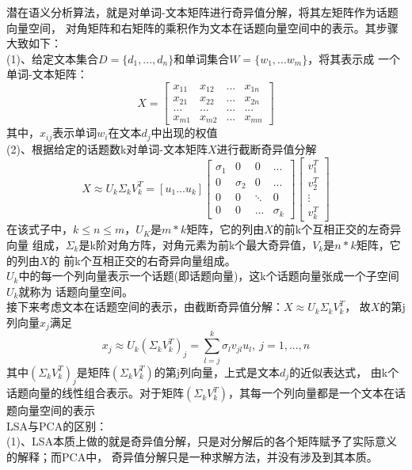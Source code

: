 \documentclass[answers]{exam}  %
\begin{document}
\begin{questions}
\begin{solution}
\begin{parts}
		潜在语义分析算法，就是对单词-文本矩阵进行奇异值分解，将其左矩阵作为话题向量空间，
		对角矩阵和右矩阵的乘积作为文本在话题向量空间中的表示。其步骤大致如下：\\
		(1)、给定文本集合$D=\{d_1,...,d_n\}$和单词集合$W=\{w_1,...w_m\}$，将其表示成
		一个单词-文本矩阵：$$X=
\left[
\begin{matrix}
	x_{11} & x_{12} & ... & x_{1n}\\
	x_{21} & x_{22} & ... & x_{2n}\\
	...    & ...    & ... & ...\\
	x_{m1} & x_{m2} & ... & x_{mn}
\end{matrix}
\right]
		$$
		其中，$x_{ij}$表示单词$w_i$在文本$d_j$中出现的权值\\
		(2)、根据给定的话题数k对单词-文本矩阵$X$进行截断奇异值分解$$
		X\approx U_k\Sigma_kV_k^T=[u_1 ... u_k ]
\left[
	\begin{matrix}
		\sigma_1 & 0 & 0 & ... \\
		0 & \sigma_2 & 0 & ... \\
		0 & 0 & \ddots & 0\\
		0 & 0 & ... & \sigma_k
	\end{matrix}		
\right]
\left[
	\begin{matrix}
		v_1^T\\
		v_2^T\\
		\vdots\\
		v_k^T
	\end{matrix}		
\right]
$$
在该式子中，$k\leq n\leq m$，$U_K$是$m*k$矩阵，它的列由$X$的前k个互相正交的左奇异向量
组成，$\Sigma_k$是k阶对角方阵，对角元素为前k个最大奇异值，$V_k$是$n*k$矩阵，它的列由$X$的
前k个互相正交的右奇异向量组成。\\

$U_k$中的每一个列向量表示一个话题(即话题向量)，这k个话题向量张成一个子空间$U_k$就称为
话题向量空间。\\

接下来考虑文本在话题空间的表示，由截断奇异值分解：$X\approx U_k\Sigma_kV_k^T$，
故$X$的第j列向量$x_j$满足$$x_j\approx U_k(\Sigma_kV_k^T)_j=\sum\limits_{l=j}^k\sigma_lv_{jl}u_l,\ j=1,...,n$$
其中$(\Sigma_kV_k^T)_j$是矩阵$(\Sigma_kV_k^T)$的第j列向量，上式是文本$d_j$的近似表达式，
由k个话题向量的线性组合表示。对于矩阵$(\Sigma_kV_k^T)$，其每一个列向量都是一个文本在话题向量空间的表示\\

LSA与PCA的区别：\\
(1)、LSA本质上做的就是奇异值分解，只是对分解后的各个矩阵赋予了实际意义的解释；而PCA中，
奇异值分解只是一种求解方法，并没有涉及到其本质。\\


\end{parts}
\end{solution}
\end{questions}
\end{document}
